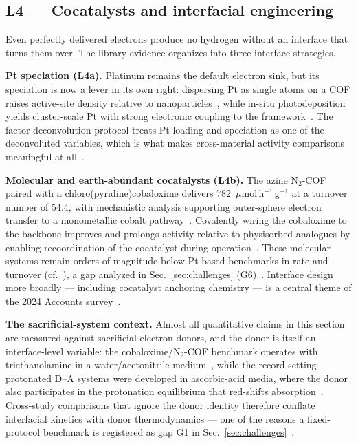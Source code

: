 \subsection{L4 --- Cocatalysts and interfacial engineering}
\label{sec:interface}

Even perfectly delivered electrons produce no hydrogen without an interface that turns them
over. The library evidence organizes into three interface strategies.

\textbf{Pt speciation (L4a).} Platinum remains the default electron sink, but its speciation is
now a lever in its own right: dispersing Pt as single atoms on a COF raises active-site density
relative to nanoparticles~\cite{dong2021platinum}, while in-situ photodeposition yields
cluster-scale Pt with strong electronic coupling to the framework~\cite{li2022in}. The
factor-deconvolution protocol treats Pt loading and speciation as one of the deconvoluted
variables, which is what makes cross-material activity comparisons meaningful at
all~\cite{ghosh2020identification}.

\textbf{Molecular and earth-abundant cocatalysts (L4b).} The azine N$_2$-COF paired with a
chloro(pyridine)cobaloxime delivers 782~$\mu$mol\,h$^{-1}$\,g$^{-1}$ at a turnover number of
54.4, with mechanistic analysis supporting outer-sphere electron transfer to a monometallic
cobalt pathway~\cite{banerjee2017single}. Covalently wiring the cobaloxime to the backbone
improves and prolongs activity relative to physisorbed analogues by enabling recoordination of
the cocatalyst during operation~\cite{gottschling2020rational}. These molecular systems remain
orders of magnitude below Pt-based benchmarks in rate and turnover
(cf.~\cite{yang2021protonated}), a gap analyzed in Sec.~\ref{sec:challenges}
(G6)~\cite{banerjee2017single,gottschling2020rational}. Interface design more broadly ---
including cocatalyst anchoring chemistry --- is a central theme of the 2024 Accounts
survey~\cite{chen2024photocatalysis}.

\textbf{The sacrificial-system context.} Almost all quantitative claims in this section are
measured against sacrificial electron donors, and the donor is itself an interface-level
variable: the cobaloxime/N$_2$-COF benchmark operates with triethanolamine in a
water/acetonitrile medium~\cite{banerjee2017single}, while the record-setting protonated D--A
systems were developed in ascorbic-acid media, where the donor also participates in the
protonation equilibrium that red-shifts absorption~\cite{yang2021protonated}. Cross-study
comparisons that ignore the donor identity therefore conflate interfacial kinetics with donor
thermodynamics --- one of the reasons a fixed-protocol benchmark is registered as gap G1 in
Sec.~\ref{sec:challenges}~\cite{ghosh2020identification,banerjee2017single}.

